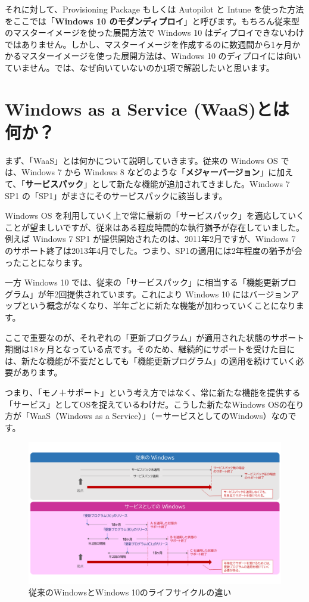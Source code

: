 それに対して、Provisioning Package もしくは Autopilot と Intune を使った方法をここでは「\textbf{Windows 10 のモダンディプロイ}」と呼びます。もちろん従来型のマスターイメージを使った展開方法で Windows 10 はディプロイできないわけではありません。しかし、マスターイメージを作成するのに数週間から1ヶ月かかるマスターイメージを使った展開方法は、Windows 10 のディプロイには向いていません。では、なぜ向いていないのか\ref{sec:WaaS}項で解説したいと思います。

\section{Windows as a Service (WaaS)とは何か？}
\label{sec:WaaS}

まず、「WaaS」とは何かについて説明していきます。従来の Windows OS では、Windows 7 から Windows 8 などのような「\textbf{メジャーバージョン}」に加えて、「\textbf{サービスパック}」として新たな機能が追加されてきました。Windows 7 SP1 の「SP1」がまさにそのサービスパックに該当します。

Windows OS を利用していく上で常に最新の「サービスパック」を適応していくことが望ましいですが、従来はある程度時間的な執行猶予が存在していました。例えば Windows 7 SP1 が提供開始されたのは、2011年2月ですが、Windows 7 のサポート終了は2013年4月でした。つまり、SP1の適用には2年程度の猶予が会ったことになります。

一方 Windows 10 では、従来の「サービスパック」に相当する「機能更新プログラム」が年2回提供されています。これにより Windows 10 にはバージョンアップという概念がなくなり、半年ごとに新たな機能が加わっていくことになります。

ここで重要なのが、それぞれの「更新プログラム」が適用された状態のサポート期間は18ヶ月となっている点です。そのため、継続的にサポートを受けた目には、新たな機能が不要だとしても「機能更新プログラム」の適用を続けていく必要があります。

つまり、「モノ＋サポート」という考え方ではなく、常に新たな機能を提供する「サービス」としてOSを捉えているわけだ。こうした新たなWindows OSの在り方が「WaaS（Windows as a Service）」（＝サービスとしてのWindows）なのです。

\begin{figure}[htbp]
    \centering
    \includegraphics[width=17cm]{figures/WaaS.png}
    \caption{従来のWindowsとWindows 10のライフサイクルの違い}
    \label{}
\end{figure}

